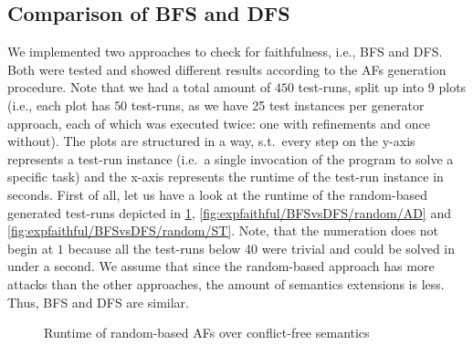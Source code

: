 \subsection{Comparison of BFS and DFS}
\label{subsec:faithfulComparisonBFSvsDFS}

\newcommand{\plotWidth}{10cm}
\newcommand{\plotHeight}{8cm}
\newcommand{\plotHeightSmall}{5cm}


We implemented two approaches to check for faithfulness, i.e., BFS and DFS. Both were tested and showed different results according to the AFs generation procedure. Note that we had a total amount of $450$ test-runs, split up into 9 plots (i.e., each plot has $50$ test-runs, as we have 25 test instances per generator approach, each of which was executed twice: one with refinements and once without). The plots are structured in a way, s.t.\ every step on the y-axis represents a test-run instance (i.e.\ a single invocation of the program to solve a specific task) and the x-axis represents the runtime of the test-run instance in seconds. First of all, let us have a look at the runtime of the random-based generated test-runs depicted in \cref{fig:expfaithful/BFSvsDFS/random/CF}, \cref{fig:expfaithful/BFSvsDFS/random/AD} and \cref{fig:expfaithful/BFSvsDFS/random/ST}.
Note, that the numeration does not begin at $1$ because all the test-runs below 40 were trivial and could be solved in under a second. We assume that since the random-based approach has more attacks than the other approaches, the amount of semantics extensions is less. Thus, BFS and DFS are similar.




\begin{figure}[H]
    \centering
    \caption{Runtime of random-based AFs over conflict-free semantics}
    \label{fig:expfaithful/BFSvsDFS/random/CF}
\end{figure}


